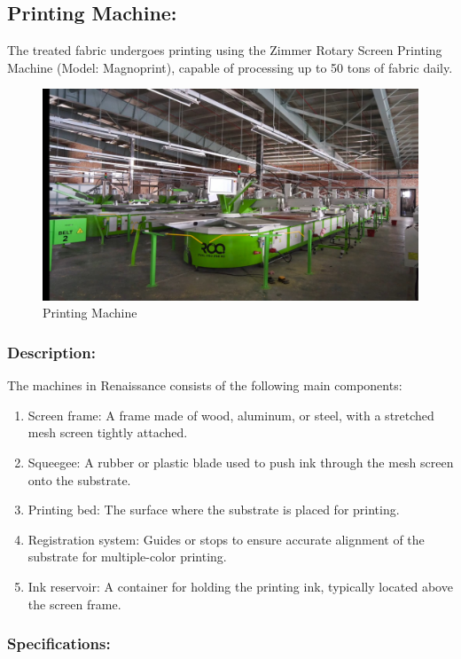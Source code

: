 \subsection{Printing Machine:} 
The treated fabric undergoes printing using the Zimmer Rotary Screen Printing Machine (Model: Magnoprint), capable of processing up to 50 tons of fabric daily.

\begin{figure}[h!]
  \centering
  \includegraphics[width=0.8\linewidth]{figs/placement_printing.jpg}
  \caption{Printing Machine}
  \label{fig:Printing Machine}
\end{figure}

\subsubsection{Description:}


The machines in Renaissance consists of the following main
components:


\begin{enumerate}
\item
  Screen frame: A frame made of wood, aluminum, or steel, with a
  stretched mesh screen tightly attached.
\item
  Squeegee: A rubber or plastic blade used to push ink through the mesh
  screen onto the substrate.
\item
  Printing bed: The surface where the substrate is placed for printing.
\item
  Registration system: Guides or stops to ensure accurate alignment of
  the substrate for multiple-color printing.
\item
  Ink reservoir: A container for holding the printing ink, typically
  located above the screen frame.
\end{enumerate}

\subsubsection{Specifications:}

